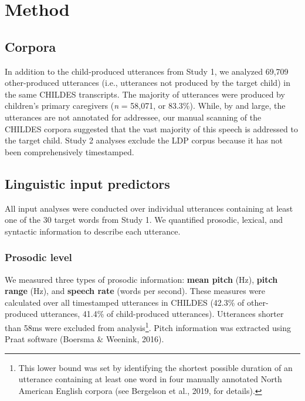 \documentclass[10pt, letterpaper]{article}
\begin{document}
\hypertarget{method-1}{%
\section{Method}\label{method-1}}

\hypertarget{corpora-1}{%
\subsection{Corpora}\label{corpora-1}}

In addition to the child-produced utterances from Study 1, we analyzed
69,709 other-produced utterances (i.e., utterances not produced by the
target child) in the same CHILDES transcripts. The majority of
utterances were produced by children's primary caregivers (\emph{n} =
58,071, or 83.3\%). While, by and large, the utterances are not
annotated for addressee, our manual scanning of the CHILDES corpora
suggested that the vast majority of this speech is addressed to the
target child. Study 2 analyses exclude the LDP corpus because it has not
been comprehensively timestamped.

\hypertarget{linguistic-input-predictors}{%
\subsection{Linguistic input
predictors}\label{linguistic-input-predictors}}

All input analyses were conducted over individual utterances containing
at least one of the 30 target words from Study 1. We quantified
prosodic, lexical, and syntactic information to describe each utterance.

\hypertarget{prosodic-level}{%
\subsubsection{Prosodic level}\label{prosodic-level}}

We measured three types of prosodic information: \textbf{mean pitch}
(Hz), \textbf{pitch range} (Hz), and \textbf{speech rate} (words per
second). These measures were calculated over all timestamped utterances
in CHILDES (42.3\% of other-produced utterances, 41.4\% of
child-produced utterances). Utterances shorter than 58ms were excluded
from analysis\footnote{This lower bound was set by identifying the
  shortest possible duration of an utterance containing at least one
  word in four manually annotated North American English corpora (see
  Bergelson et al., 2019, for details).}. Pitch information was
extracted using Praat software (Boersma \& Weenink, 2016).
\end{document}
